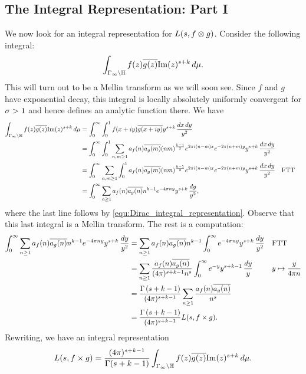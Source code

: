     \subsection*{The Integral Representation: Part I}
      We now look for an integral representation for $L(s,f \otimes g)$. Consider the following integral:
      \[
        \int_{\Gamma_{\infty}\backslash\mathbb{H}}f(z)\overline{g(z)}\mathrm{Im}(z)^{s+k}\,d\mu.
      \]
      This will turn out to be a Mellin transform as we will soon see. Since $f$ and $g$ have exponential decay, this integral is locally absolutely uniformly convergent for $\sigma > 1$ and hence defines an analytic function there. We have
      \begin{align*}
        \int_{\Gamma_{\infty}\backslash\mathbb{H}}f(z)\overline{g(z)}\mathrm{Im}(z)^{s+k}\,d\mu &= \int_{0}^{\infty}\int_{0}^{1}f(x+iy)\overline{g(x+iy)}y^{s+k}\,\frac{dx\,dy}{y^{2}} \\
        &= \int_{0}^{\infty}\int_{0}^{1}\sum_{n,m \ge 1}a_{f}(n)\overline{a_{g}(m)}(nm)^{\frac{k-1}{2}}e^{2\pi i(n-m)x}e^{-2\pi(n+m)y}y^{s+k}\,\frac{dx\,dy}{y^{2}} \\
        &= \int_{0}^{\infty}\sum_{n,m \ge 1}\int_{0}^{1}a_{f}(n)\overline{a_{g}(m)}(nm)^{\frac{k-1}{2}}e^{2\pi i(n-m)x}e^{-2\pi(n+m)y}y^{s+k}\,\frac{dx\,dy}{y^{2}} && \text{FTT} \\
        &= \int_{0}^{\infty}\sum_{n \ge 1}a_{f}(n)\overline{a_{g}(n)}n^{k-1}e^{-4\pi ny}y^{s+k}\,\frac{dy}{y^{2}},
      \end{align*}
      where the last line follows by \cref{equ:Dirac_integral_representation}. Observe that this last integral is a Mellin transform. The rest is a computation:
      \begin{align*}
        \int_{0}^{\infty}\sum_{n \ge 1}a_{f}(n)\overline{a_{g}(n)}n^{k-1}e^{-4\pi ny}y^{s+k}\,\frac{dy}{y^{2}} &= \sum_{n \ge 1}a_{f}(n)\overline{a_{g}(n)}n^{k-1}\int_{0}^{\infty}e^{-4\pi ny}y^{s+k}\,\frac{dy}{y^{2}} &&\text{FTT} \\
        &= \sum_{n \ge 1}\frac{a_{f}(n)\overline{a_{g}(n)}}{(4\pi)^{s+k-1}n^{s}}\int_{0}^{\infty}e^{-y}y^{s+k-1}\,\frac{dy}{y} &&\text{$y \mapsto \frac{y}{4\pi n}$} \\
        &= \frac{\Gamma\left(s+k-1\right)}{(4\pi)^{s+k-1}}\sum_{n \ge 1}\frac{a_{f}(n)\overline{a_{g}(n)}}{n^{s}} \\
        &= \frac{\Gamma\left(s+k-1\right)}{(4\pi)^{s+k-1}}L(s,f \times g).
      \end{align*}
      Rewriting, we have an integral representation
      \[
        L(s,f \times g) = \frac{(4\pi)^{s+k-1}}{\Gamma(s+k-1)}\int_{\Gamma_{\infty}\backslash\mathbb{H}}f(z)\overline{g(z)}\mathrm{Im}(z)^{s+k}\,d\mu.
      \]
